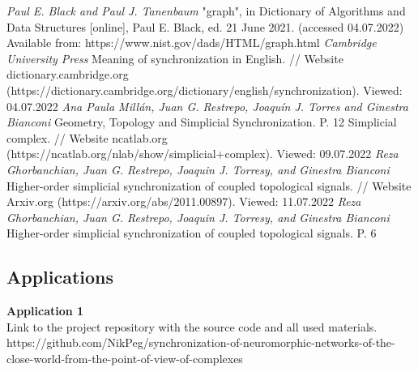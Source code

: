 \documentclass[draft]{article}
\newcommand\zz[1]{\par{\normalsize\strut #1} \hfill\ignorespaces}
\begin{document}
\newpage
\begin{center}
\begin{thebibliography}{}
 \textit{Paul E. Black and Paul J. Tanenbaum} "graph", in Dictionary of Algorithms and Data Structures [online], Paul E. Black, ed. 21 June 2021. (accessed 04.07.2022) Available from: https://www.nist.gov/dads/HTML/graph.html
 \textit{Cambridge University Press} Meaning of synchronization in English. // Website dictionary.cambridge.org (https://dictionary.cambridge.org/dictionary/english/synchronization). Viewed: 04.07.2022
 \textit{Ana Paula Millán, Juan G. Restrepo, Joaquín J. Torres and Ginestra Bianconi} Geometry, Topology and Simplicial Synchronization. P. 12
 Simplicial complex. // Website ncatlab.org (https://ncatlab.org/nlab/show/simplicial+complex). Viewed: 09.07.2022
 \textit{Reza Ghorbanchian, Juan G. Restrepo, Joaquin J. Torresy, and Ginestra Bianconi} Higher-order simplicial synchronization of coupled topological signals. // Website Arxiv.org (https://arxiv.org/abs/2011.00897). Viewed: 11.07.2022
 \textit{Reza Ghorbanchian, Juan G. Restrepo, Joaquin J. Torresy, and Ginestra Bianconi} Higher-order simplicial synchronization of coupled topological signals. P. 6
\end{thebibliography}
\end{center}
\newpage
\begin{center}
\section {Applications}
\end{center}
\zz{}\textbf{Application 1\\}
Link to the project repository with the source code and all used materials.\\
https://github.com/NikPeg/synchronization-of-neuromorphic-networks-of-the-close-world-from-the-point-of-view-of-complexes\\
\end{document}
